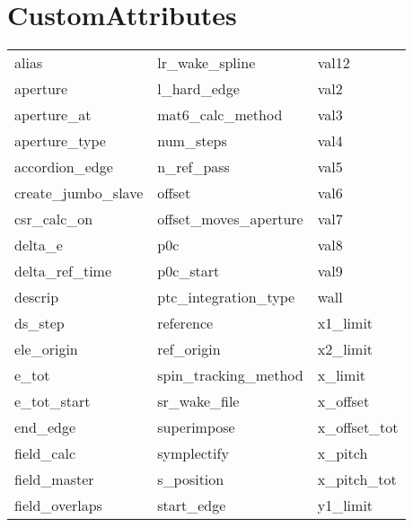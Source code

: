  \section{CustomAttributes}
 \label{s:list.custom}
 
 \begin{tabular}{lll} \toprule
alias                       & lr_wake_spline              & val12                       \\
aperture                    & l_hard_edge                 & val2                        \\
aperture_at                 & mat6_calc_method            & val3                        \\
aperture_type               & num_steps                   & val4                        \\
accordion_edge              & n_ref_pass                  & val5                        \\
create_jumbo_slave          & offset                      & val6                        \\
csr_calc_on                 & offset_moves_aperture       & val7                        \\
delta_e                     & p0c                         & val8                        \\
delta_ref_time              & p0c_start                   & val9                        \\
descrip                     & ptc_integration_type        & wall                        \\
ds_step                     & reference                   & x1_limit                    \\
ele_origin                  & ref_origin                  & x2_limit                    \\
e_tot                       & spin_tracking_method        & x_limit                     \\
e_tot_start                 & sr_wake_file                & x_offset                    \\
end_edge                    & superimpose                 & x_offset_tot                \\
field_calc                  & symplectify                 & x_pitch                     \\
field_master                & s_position                  & x_pitch_tot                 \\
field_overlaps              & start_edge                  & y1_limit                    \\

\end{tabular}
